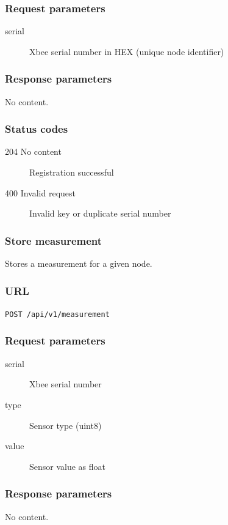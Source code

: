 \documentclass[a4paper,11pt]{scrartcl}
\begin{document}
\subsubsection*{Request parameters}
\begin{description}
\item[serial] Xbee serial number in HEX (unique node identifier)
\end{description}

\subsubsection*{Response parameters}
No content.

\subsubsection*{Status codes}
\begin{description}
\item[204 No content] Registration successful
\item[400 Invalid request] Invalid key or duplicate serial number
\end{description}

\subsubsection{Store measurement}
Stores a measurement for a given node.

\subsubsection*{URL}
\texttt{POST /api/v1/measurement}

\subsubsection*{Request parameters}
\begin{description}
\item[serial] Xbee serial number
\item[type] Sensor type (uint8)
\item[value] Sensor value as float
\end{description}

\subsubsection*{Response parameters}
No content.
\end{document}

